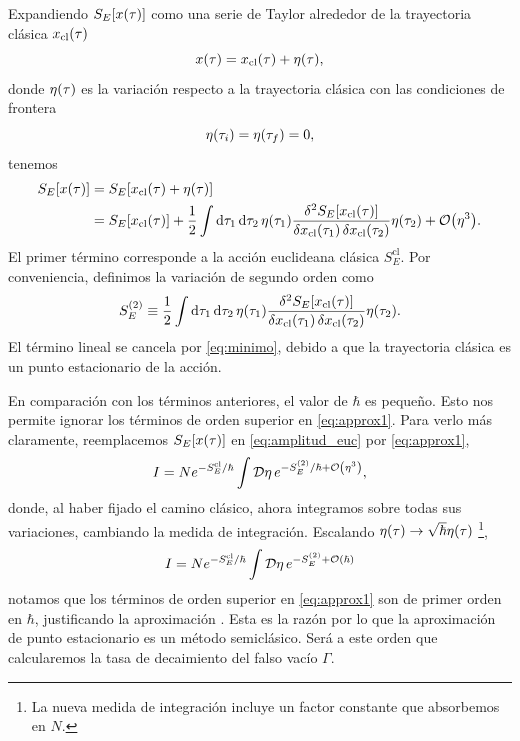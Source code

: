 Expandiendo $S_E\qty[x\qty(\tau)]$ como una serie de Taylor alrededor de la trayectoria clásica $x_{\text{cl}}\qty(\tau)$
\begin{equation} \label{eq:trayec}
	x\qty(\tau) = x_{\textrm{cl}}\qty(\tau) + \eta\qty(\tau),
\end{equation}
donde $\eta\qty(\tau)$ es la variación respecto a la trayectoria clásica con las condiciones de frontera
\begin{equation}
	\eta\qty(\tau_i) = \eta\qty(\tau_f) = 0,
\end{equation}
tenemos
\begin{align} 
S_{E}\qty[x\qty(\tau)] &= S_{E}[x_{\textrm{cl}}(\tau) +  \eta\qty(\tau)] \\ 
&= S_{E}[x_{\textrm{cl}}\qty(\tau)]
+ \frac{1}{2} \int \dd{\tau_1} \dd{\tau_2} \eta(\tau_1) \frac{\delta^2 S_E[x_{\textrm{cl}}\qty(\tau)]}{\var{x_{\textrm{cl}}\qty(\tau_1)} \var{x_{\textrm{cl}}\qty(\tau_2)}} \eta\qty(\tau_2) + \order{\eta^3}. \label{eq:approx1}
\end{align}
El primer término corresponde a la acción euclideana clásica  $S_E^{\textrm{cl}}$. Por conveniencia, definimos la variación de segundo orden como
\begin{equation}
	S_E^{(2)} \equiv \frac{1}{2} \int \dd{\tau_1} \dd{\tau_2} \eta\qty(\tau_1) \frac{\delta^2 S_E[x_{\textrm{cl}}\qty(\tau)]}{\var{x_{\textrm{cl}}(\tau_1)} \var{x_{\textrm{cl}}\qty(\tau_2)}} \eta\qty(\tau_2). \label{eq:S_2}
\end{equation}
El término lineal se cancela  por \eqref{eq:minimo}, debido a que la trayectoria clásica es un punto estacionario de la acción. 

En comparación con los términos anteriores, el valor de $\hbar$ es pequeño. Esto nos permite ignorar los términos de orden superior en \eqref{eq:approx1}. Para verlo más claramente, reemplacemos $S_{E}\qty[x\qty(\tau)]$ en \eqref{eq:amplitud_euc} por \eqref{eq:approx1},
\begin{equation}\label{eq:Iaprox1}
I = N e^{-S_E^{\textrm{cl}}/\hbar} \int \mathcal{D}\eta \, e^{-S_E^{(2)}/\hbar + \order{\eta^3}},
\end{equation}
donde, al haber fijado el camino clásico, ahora integramos sobre todas sus variaciones, cambiando la medida de integración. Escalando $\eta\qty(\tau) \rightarrow \sqrt{\hbar}\eta\qty(\tau)$ \footnote{La nueva medida de integración incluye un factor constante que absorbemos en $N$.},
\begin{equation}\label{eq:Iaprox2}
I = N e^{-S_E^{\textrm{cl}}/\hbar} \int \mathcal{D}\eta \, e^{-S_E^{(2)} + \order{\hbar}}
\end{equation}
notamos que los términos de orden superior en \eqref{eq:approx1} son de primer orden en $\hbar$, justificando la aproximación \cite{paranjape2017theory}. Esta es la razón por lo que la aproximación de punto estacionario es un método semiclásico. Será a este orden que calcularemos la tasa de decaimiento del falso vacío $\Gamma$. 

